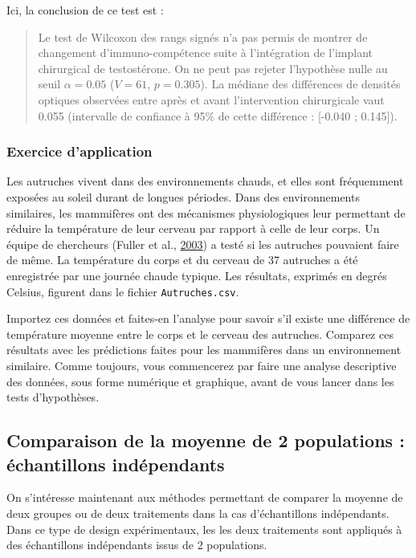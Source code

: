 \documentclass[a4paperpaper,]{article}
\begin{document}
Ici, la conclusion de ce test est :

\begin{quote}
Le test de Wilcoxon des rangs signés n'a pas permis de montrer de changement d'immuno-compétence suite à l'intégration de l'implant chirurgical de testostérone. On ne peut pas rejeter l'hypothèse nulle au seuil \(\alpha = 0.05\) (\(V = 61\), \(p = 0.305\)). La médiane des différences de densités optiques observées entre après et avant l'intervention chirurgicale vaut 0.055 (intervalle de confiance à 95\% de cette différence : {[}-0.040 ; 0.145{]}).
\end{quote}

\hypertarget{exercice-dapplication-1}{%
\subsubsection{Exercice d'application}\label{exercice-dapplication-1}}

Les autruches vivent dans des environnements chauds, et elles sont fréquemment exposées au soleil durant de longues périodes. Dans des environnements similaires, les mammifères ont des mécanismes physiologiques leur permettant de réduire la température de leur cerveau par rapport à celle de leur corps. Un équipe de chercheurs (Fuller et al., \protect\hyperlink{ref-Fuller2003}{2003}) a testé si les autruches pouvaient faire de même. La température du corps et du cerveau de 37 autruches a été enregistrée par une journée chaude typique. Les résultats, exprimés en degrés Celsius, figurent dans le fichier \texttt{Autruches.csv}.

Importez ces données et faites-en l'analyse pour savoir s'il existe une différence de température moyenne entre le corps et le cerveau des autruches. Comparez ces résultats avec les prédictions faites pour les mammifères dans un environnement similaire. Comme toujours, vous commencerez par faire une analyse descriptive des données, sous forme numérique et graphique, avant de vous lancer dans les tests d'hypothèses.

\hypertarget{Indep}{%
\subsection{Comparaison de la moyenne de 2 populations : échantillons indépendants}\label{Indep}}

On s'intéresse maintenant aux méthodes permettant de comparer la moyenne de deux groupes ou de deux traitements dans la cas d'échantillons indépendants. Dans ce type de design expérimentaux, les les deux traitements sont appliqués à des échantillons indépendants issus de 2 populations.
\end{document}
